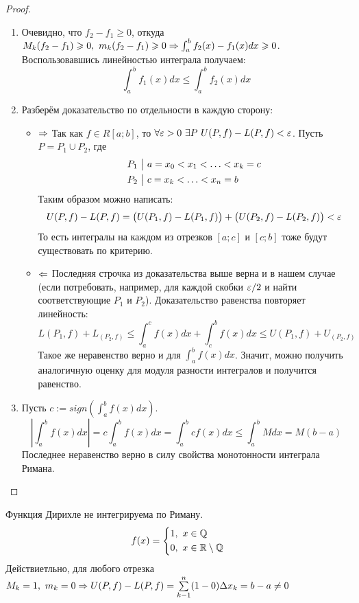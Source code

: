 \begin{proof}
\begin{enumerate}
		\item Очевидно, что $f_2 - f_1 \geq 0$, откуда $M_k(f_2 - f_1) \geqslant 0,\ m_k(f_2 - f_1) \geqslant 0 \Rightarrow \int_a^bf_2(x)-f_1(x)dx \geqslant 0$.
		Воспользовавшись линейностью интеграла получаем:
		\[
		\int_a^bf_1(x)dx \leq \int_a^bf_2(x)dx
		\]
		
		\item Разберём доказательство по отдельности в каждую сторону:
		\begin{itemize}
			\item $\Rightarrow$ Так как $f \in R[a;b]$, то $\forall \varepsilon > 0\ \exists P\ U(P, f) - L(P, f) < \varepsilon$.
			Пусть $P = P_1 \cup P_2$, где 
			\begin{align*}
				&{P_1\ \big|\  a = x_0 < x_1 < \ldots < x_k = c}
				\\
				&{P_2\ \big|\  c = x_k < \ldots < x_n = b}
			\end{align*}
			Таким образом можно написать:
			\[
			U(P, f) - L(P, f) = \big(U(P_1, f) - L(P_1, f)\big) + \big(U(P_2, f) - L(P_2, f)\big) < \varepsilon
			\]
			То есть интегралы на каждом из отрезков $[a; c]$ и $[c; b]$ тоже будут существовать по критерию.
			
			\item $\Leftarrow$ Последняя строчка из доказательства выше верна и в нашем случае (если потребовать, например, для каждой скобки $\varepsilon/2$ и найти соответствующие $P_1$ и $P_2$). Доказательство равенства повторяет линейность:
			\[
			L(P_1, f) + L_(P_2, f) \leq \int_a^c f(x)dx + \int_c^b f(x)dx \leq U(P_1, f) + U_(P_2, f)
			\]
			Такое же неравенство верно и для $\int_a^b f(x)dx$. Значит, можно получить аналогичную оценку для модуля разности интегралов и получится равенство.
		\end{itemize}
		\item Пусть $c := sign\left(\int_a^bf(x)dx\right)$.
		\[
		\left|\int_a^b f(x)dx\right| = c \int_a^b f(x)dx = \int_a^b cf(x)dx \leq \int_a^b Mdx = M(b - a)
		\]
		Последнее неравенство верно в силу свойства монотонности интеграла Римана.
	\end{enumerate}
\end{proof}


\begin{example}
	Функция Дирихле не интегрируема по Риману.
	\[
		f(x) = \left\{\begin{aligned}
			&1,\ x\in \mathbb{Q}
			\\
			&0,\ x\in \mathbb{R} \setminus \mathbb{Q}
		\end{aligned}\right.
	\]
	Действиетльно, для любого отрезка $M_k = 1,\ m_k = 0 \Rightarrow U(P, f) - L(P, f) = \sum\limits_{k - 1}^n(1 - 0)\Delta x_k = b - a \neq 0$
\end{example}

